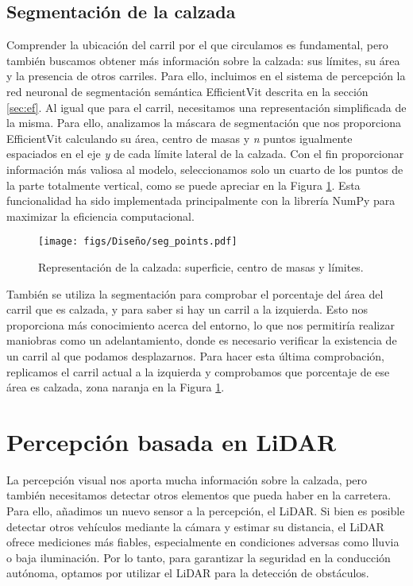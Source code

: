 \subsection{Segmentación de la calzada}
\label{sec:per_ef}

Comprender la ubicación del carril por el que circulamos es fundamental, pero también buscamos obtener más información sobre la calzada: sus límites, su área y la presencia de otros carriles. Para ello, incluimos en el sistema de percepción la red neuronal de segmentación semántica EfficientVit descrita en la sección \ref{sec:ef}. Al igual que para el carril, necesitamos una representación simplificada de la misma. Para ello, analizamos la máscara de segmentación que nos proporciona EfficientVit calculando su área, centro de masas y \textit{n} puntos igualmente espaciados en el eje \textit{y} de cada límite lateral de la calzada. Con el fin proporcionar información más valiosa al modelo, seleccionamos solo un cuarto de los puntos de la parte totalmente vertical, como se puede apreciar en la Figura \ref{fig:seg_params}. Esta funcionalidad ha sido implementada principalmente con la librería NumPy para maximizar la eficiencia computacional.
\begin{figure}[ht]
\centering
\texttt{[image: figs/Diseño/seg\_points.pdf]}
\caption{Representación de la calzada: superficie, centro de masas y límites.}
\label{fig:seg_params}
\end{figure}

También se utiliza la segmentación para comprobar el porcentaje del área del carril que es calzada, y para saber si hay un carril a la izquierda. Esto nos proporciona más conocimiento acerca del entorno, lo que nos permitiría realizar maniobras como un adelantamiento, donde es necesario verificar la existencia de un carril al que podamos desplazarnos. Para hacer esta última comprobación, replicamos el carril actual a la izquierda y comprobamos que porcentaje de ese área es calzada, zona naranja en la Figura \ref{fig:seg_params}.

\section{Percepción basada en LiDAR}

La percepción visual nos aporta mucha información sobre la calzada, pero también necesitamos detectar otros elementos que pueda haber en la carretera. Para ello, añadimos un nuevo sensor a la percepción, el \ac{LiDAR}. Si bien es posible detectar otros vehículos mediante la cámara y estimar su distancia, el \ac{LiDAR} ofrece mediciones más fiables, especialmente en condiciones adversas como lluvia o baja iluminación. Por lo tanto, para garantizar la seguridad en la conducción autónoma, optamos por utilizar el \ac{LiDAR} para la detección de obstáculos.

